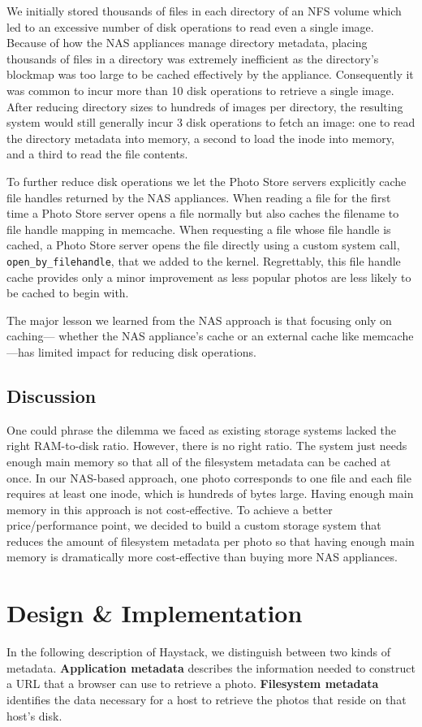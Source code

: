 \documentclass[11pt]{article}
\begin{document}
We initially stored thousands of files in each directory of an NFS volume which led to an excessive
number of disk operations to read even a single image. Because of how the NAS appliances manage
directory metadata, placing thousands of files in a directory was extremely inefficient as the
directory’s blockmap was too large to be cached effectively by the appliance. Consequently it was
common to incur more than 10 disk operations to retrieve a single image. After reducing directory
sizes to hundreds of images per directory, the resulting system would still generally incur 3 disk
operations to fetch an image: one to read the directory metadata into memory, a second to load the
inode into memory, and a third to read the file contents.

To further reduce disk operations we let the Photo Store servers explicitly cache file handles
returned by the NAS appliances. When reading a file for the first time a Photo Store server opens a
file normally but also caches the filename to file handle mapping in memcache. When requesting a file
whose file handle is cached, a Photo Store server opens the file directly using a custom system call,
\texttt{open\_by\_filehandle}, that we added to the kernel. Regrettably, this file handle cache provides only a
minor improvement as less popular photos are less likely to be cached to begin with.

The major lesson we learned from the NAS approach is that focusing only on caching— whether the NAS
appliance’s cache or an external cache like memcache—has limited impact for reducing disk operations.
\subsection{Discussion}
\label{sec:org44b857f}
One could phrase the dilemma we faced as existing storage systems lacked the right RAM-to-disk ratio.
However, there is no right ratio. The system just needs enough main memory so that all of the
filesystem metadata can be cached at once. In our NAS-based approach, one photo corresponds to one
file and each file requires at least one inode, which is hundreds of bytes large. Having enough main
memory in this approach is not cost-effective. To achieve a better price/performance point, we decided
to build a custom storage system that reduces the amount of filesystem metadata per photo so that
having enough main memory is dramatically more cost-effective than buying more NAS appliances.
\section{Design \& Implementation}
\label{sec:org60fd19d}
In the following description of Haystack, we distinguish between two kinds of metadata. \textbf{Application
metadata} describes the information needed to construct a URL that a browser can use to retrieve a
photo. \textbf{Filesystem metadata} identifies the data necessary for a host to retrieve the photos that reside
on that host’s disk.
\end{document}
